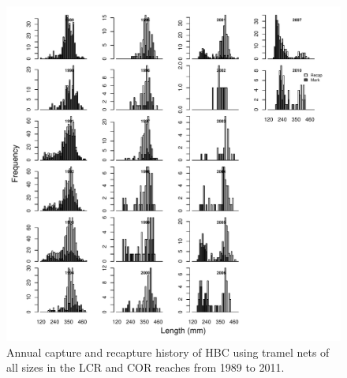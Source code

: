 \begin{figure}[htbp]
	\centering
		\includegraphics[width=6.5in]{../FIGS/LSMR/fig:MarksAtLengthGILL.pdf}
	\caption{Annual capture and recapture history of HBC using tramel nets of all sizes in the LCR and COR reaches from 1989 to 2011.}
	\label{fig:FIGS_LSMR_fig:MarksAtLengthGILL}
\end{figure}





